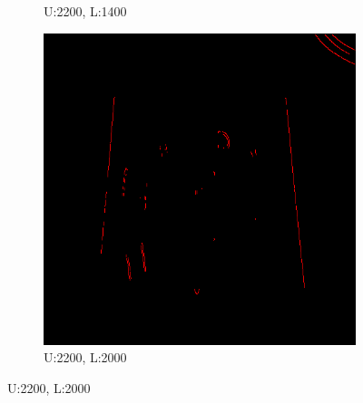 \documentclass[11pt]{article}
\begin{document}
\begin{figure}[!h]
\begin{subfigure}[t]{.25\textwidth}
		\caption{U:2200, L:1400}
	\end{subfigure}
\hfill
	\begin{subfigure}[t]{.25\textwidth}
		\centering
		\includegraphics[scale=0.3]{pics/normalThreshTest/Upper2200lower2000kernel5.png}
		\caption{U:2200, L:2000}
	\end{subfigure}


\end{figure}
\end{document}
